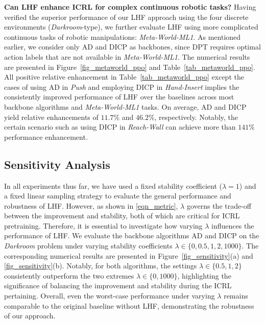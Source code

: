 \documentclass{article}
\begin{document}
\textbf{Can LHF enhance ICRL for complex continuous robotic tasks?}
%
Having verified the superior performance of our LHF approach using the four discrete environments (\textit{Darkroom}-type), we further evaluate LHF using more complicated continuous tasks of robotic manipulations: \textit{Meta-World-ML1}.
%
%
As mentioned earlier, we consider only AD and DICP as backbones, since DPT requires optimal action labels that are not available in \textit{Meta-World-ML1}.
%
%
The numerical results are presented in Figure~\ref{fig_metaworld_ppo} and Table~\ref{tab_metaworld_ppo}.
%
All positive relative enhancement in Table~\ref{tab_metaworld_ppo} except the cases of using AD in \textit{Push} and employing DICP in \textit{Hand-Insert} implies the consistently improved performance of LHF over the baselines across most backbone algorithms and \textit{Meta-World-ML1} tasks. 
%
On average, AD and DICP yield relative enhancements of $11.7\%$ and $46.2\%$, respectively. Notably, the certain scenario such as using DICP in \textit{Reach-Wall} can achieve more than $141\%$ performance enhancement.
























\subsection{Sensitivity Analysis}
\label{section_sensitivity}




In all experiments thus far, we have used a fixed stability coefficient ($\lambda = 1$) and a fixed linear sampling strategy to evaluate the general performance and robustness of LHF.
However, as shown in \eqref{eqn_metric}, $\lambda$ governs the trade-off between the improvement and stability, both of which are critical for ICRL pretraining. Therefore, it is essential to investigate how varying $\lambda$ influences the performance of LHF.
%
We evaluate the backbone algorithms AD and DICP on the \textit{Darkroom} problem under varying stability coefficients $\lambda \in \{0, 0.5, 1, 2, 1000\}$. The corresponding numerical results are presented in Figure~\ref{fig_sensitivity}(a) and \ref{fig_sensitivity}(b).
%
Notably, for both algorithms, the settings $\lambda \in \{0.5, 1, 2\}$ consistently outperform the two extremes $\lambda \in \{0, 1000\}$, highlighting the significance of balancing the improvement and stability during the ICRL pertaining. Overall, even the worst-case performance under varying $\lambda$ remains comparable to the original baseline without LHF, demonstrating the robustness of our approach.
\end{document}
